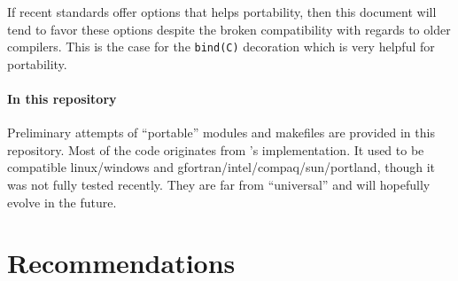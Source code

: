 \documentclass{article}
\begin{document}
If recent standards offer options that helps portability, then this document will tend to favor these options despite the broken compatibility with regards to older compilers. This is the case for the \texttt{bind(C)} decoration which is very helpful for portability.

\paragraph{In this repository} Preliminary attempts of ``portable'' modules and makefiles are provided in this repository.  Most of the code originates from 's implementation. It used to be compatible linux/windows and gfortran/intel/compaq/sun/portland, though it was not fully tested recently.
They are far from ``universal'' and will hopefully evolve in the future.

\section{Recommendations}


\end{document}
